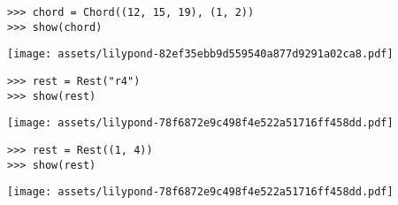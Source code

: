 \begin{comment}
<abjad>
chord = Chord((12, 15, 19), (1, 2))
show(chord)
</abjad>
\end{comment}

\begin{abjadbookoutput}
\begin{singlespacing}
\vspace{-0.5\baselineskip}
\begin{lstlisting}
>>> chord = Chord((12, 15, 19), (1, 2))
>>> show(chord)
\end{lstlisting}
\noindent\texttt{[image: assets/lilypond-82ef35ebb9d559540a877d9291a02ca8.pdf]}
\end{singlespacing}
\end{abjadbookoutput}

\begin{comment}
<abjad>
rest = Rest("r4")
show(rest)
</abjad>
\end{comment}

\begin{abjadbookoutput}
\begin{singlespacing}
\vspace{-0.5\baselineskip}
\begin{lstlisting}
>>> rest = Rest("r4")
>>> show(rest)
\end{lstlisting}
\noindent\texttt{[image: assets/lilypond-78f6872e9c498f4e522a51716ff458dd.pdf]}
\end{singlespacing}
\end{abjadbookoutput}

\begin{comment}
<abjad>
rest = Rest((1, 4))
show(rest)
</abjad>
\end{comment}

\begin{abjadbookoutput}
\begin{singlespacing}
\vspace{-0.5\baselineskip}
\begin{lstlisting}
>>> rest = Rest((1, 4))
>>> show(rest)
\end{lstlisting}
\noindent\texttt{[image: assets/lilypond-78f6872e9c498f4e522a51716ff458dd.pdf]}
\end{singlespacing}
\end{abjadbookoutput}

\begin{comment}
<abjad>
multimeasure_rest = scoretools.MultimeasureRest(1)
show(multimeasure_rest)
</abjad>
\end{comment}

